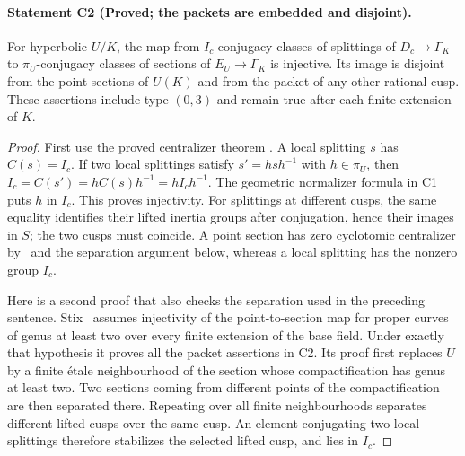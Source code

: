 \paragraph{Statement C2 (Proved; the packets are embedded and disjoint).}\label{res:C2}
For hyperbolic $U/K$, the map from $I_c$-conjugacy classes of splittings of $D_c\to\Gamma_K$ to $\pi_U$-conjugacy classes of sections of $E_U\to\Gamma_K$ is injective. Its image is disjoint from the point sections of $U(K)$ and from the packet of any other rational cusp. These assertions include type $(0,3)$ and remain true after each finite extension of $K$.
\begin{proof}
First use the proved centralizer theorem \Rtwo. A local splitting $s$ has $C(s)=I_c$. If two local splittings satisfy $s'=hsh^{-1}$ with $h\in\pi_U$, then $I_c=C(s')=hC(s)h^{-1}=hI_ch^{-1}$. The geometric normalizer formula in C1 puts $h$ in $I_c$. This proves injectivity. For splittings at different cusps, the same equality identifies their lifted inertia groups after conjugation, hence their images in $S$; the two cusps must coincide. A point section has zero cyclotomic centralizer by \Rtwo\ and the separation argument below, whereas a local splitting has the nonzero group $I_c$.

Here is a second proof that also checks the separation used in the preceding sentence. Stix~\cite[Theorem 14(1)--(2)]{Stix2008} assumes injectivity of the point-to-section map for proper curves of genus at least two over every finite extension of the base field. Under exactly that hypothesis it proves all the packet assertions in C2. Its proof first replaces $U$ by a finite étale neighbourhood of the section whose compactification has genus at least two. Two sections coming from different points of the compactification are then separated there. Repeating over all finite neighbourhoods separates different lifted cusps over the same cusp. An element conjugating two local splittings therefore stabilizes the selected lifted cusp, and lies in $I_c$.


\end{proof}
